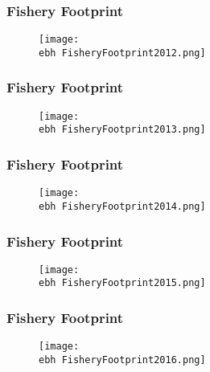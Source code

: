 \documentclass{beamer}
\newcommand{\ebh}{\string~/bio.data/bio.lobster/figures/Assessment/LFA2732/} %
\begin{document}
\begin{frame}
\frametitle{Fishery Footprint}
\begin{figure}
        \begin{center}
            \texttt{[image: \\ebh FisheryFootprint2012.png]}
        \end{center}
    \end{figure}
\end{frame}




\begin{frame}
\frametitle{Fishery Footprint}
\begin{figure}
        \begin{center}
            \texttt{[image: \\ebh FisheryFootprint2013.png]}
        \end{center}
    \end{figure}
\end{frame}




\begin{frame}
\frametitle{Fishery Footprint}
\begin{figure}
        \begin{center}
            \texttt{[image: \\ebh FisheryFootprint2014.png]}
        \end{center}
    \end{figure}
\end{frame}




\begin{frame}
\frametitle{Fishery Footprint}
\begin{figure}
        \begin{center}
            \texttt{[image: \\ebh FisheryFootprint2015.png]}
        \end{center}
    \end{figure}
\end{frame}




\begin{frame}
\frametitle{Fishery Footprint}
\begin{figure}
        \begin{center}
            \texttt{[image: \\ebh FisheryFootprint2016.png]}
        \end{center}
    \end{figure}
\end{frame}
\end{document}
